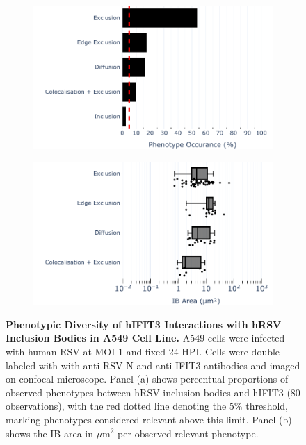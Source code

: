 \begin{figure}
    \begin{subfigure}{0.495\textwidth}
        \caption{}
        \includegraphics[width=1\linewidth]{08. Chapter 3/Figs/02. Infection/03. IFIT3/01. bar_i3_a549.pdf} 
    \end{subfigure}
    \begin{subfigure}{0.495\textwidth}
        \caption{}
        \includegraphics[width=1\linewidth]{08. Chapter 3/Figs/02. Infection/03. IFIT3/02. box_i3_a549.pdf}
    \end{subfigure}
    \caption[Phenotypic Diversity of hIFIT3 Interactions with hRSV Inclusion Bodies in A549 Cell Line.]{\textbf{Phenotypic Diversity of hIFIT3 Interactions with hRSV Inclusion Bodies in A549 Cell Line.} A549 cells were infected with human RSV at MOI 1 and fixed 24 HPI. Cells were double-labeled with with anti-RSV N and anti-IFIT3 antibodies and imaged on confocal microscope. Panel (a) shows percentual proportions of observed phenotypes between hRSV inclusion bodies and hIFIT3 (80 observations), with the red dotted line denoting the 5\% threshold, marking phenotypes considered relevant above this limit. Panel (b) shows the IB area in \(\mu \mbox{m}^2\) per observed relevant phenotype.}
    \label{fig:Phenotypic Diversity of hIFIT3 Interactions with hRSV Inclusion Bodies in A549 Cell Line}
\end{figure}

